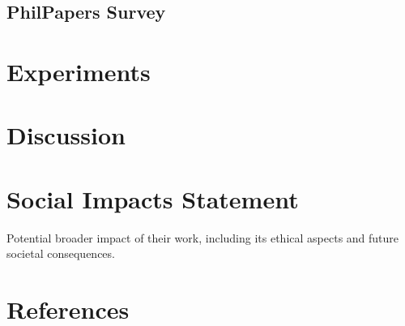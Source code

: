 \documentclass{article}
\begin{document}
\subsection{PhilPapers Survey}


\section{Experiments}


\section{Discussion}


\section*{Social Impacts Statement}
Potential broader impact of their work, including its ethical aspects and future societal consequences.

\section*{References}
\printbibliography[heading=none]

\end{document}
